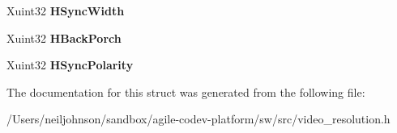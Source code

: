 \begin{DoxyCompactItemize}
\item 
\hypertarget{structstruct__vres__timing__t_ae6665d9f5eef3d1f7ebc2b0c641c06e7}{Xuint32 {\bfseries H\+Sync\+Width}}\label{structstruct__vres__timing__t_ae6665d9f5eef3d1f7ebc2b0c641c06e7}

\item 
\hypertarget{structstruct__vres__timing__t_ac6c0f2fee41b82fbd0a0f7d9de16d979}{Xuint32 {\bfseries H\+Back\+Porch}}\label{structstruct__vres__timing__t_ac6c0f2fee41b82fbd0a0f7d9de16d979}

\item 
\hypertarget{structstruct__vres__timing__t_ad2e48b09dc45215820ea24697cf435a6}{Xuint32 {\bfseries H\+Sync\+Polarity}}\label{structstruct__vres__timing__t_ad2e48b09dc45215820ea24697cf435a6}

\end{DoxyCompactItemize}


The documentation for this struct was generated from the following file\+:\begin{DoxyCompactItemize}
\item 
/\+Users/neiljohnson/sandbox/agile-\/codev-\/platform/sw/src/video\+\_\+resolution.\+h\end{DoxyCompactItemize}
